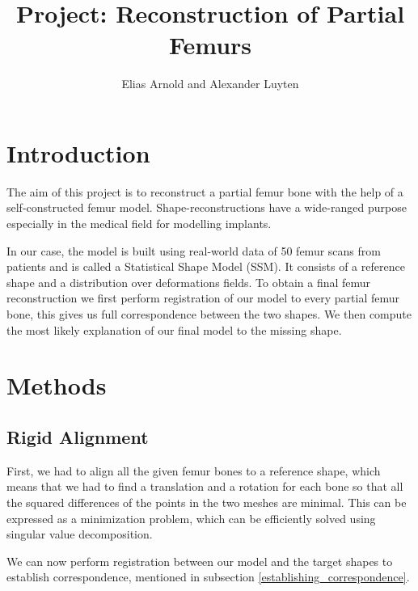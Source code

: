\documentclass{article} %
\author{Elias Arnold and Alexander Luyten}
\title{Project: Reconstruction of Partial Femurs}
\begin{document}
\maketitle
\section{Introduction}
The aim of this project is to reconstruct a partial femur bone with the help of a self-constructed femur model. Shape-reconstructions have a wide-ranged purpose especially in the medical field for modelling implants.\par
In our case, the model is built using real-world data of 50 femur scans from patients and is called a Statistical Shape Model (SSM). It consists of a reference shape and a distribution over deformations fields. To obtain a final femur reconstruction we first perform registration of our model to every partial femur bone, this gives us full correspondence between the two shapes. We then compute the most likely explanation of our final model to the missing shape.

\section{Methods}
\subsection{Rigid Alignment}
First, we had to align all the given femur bones to a reference shape, which means that we had to find a translation and a rotation for each bone so that all the squared differences of the points in the two meshes are minimal. This can be expressed as a minimization problem, which can be efficiently solved using singular value decomposition.\par
We can now perform registration between our model and the target shapes to establish correspondence, mentioned in subsection \ref{establishing_correspondence}.
\end{document}
